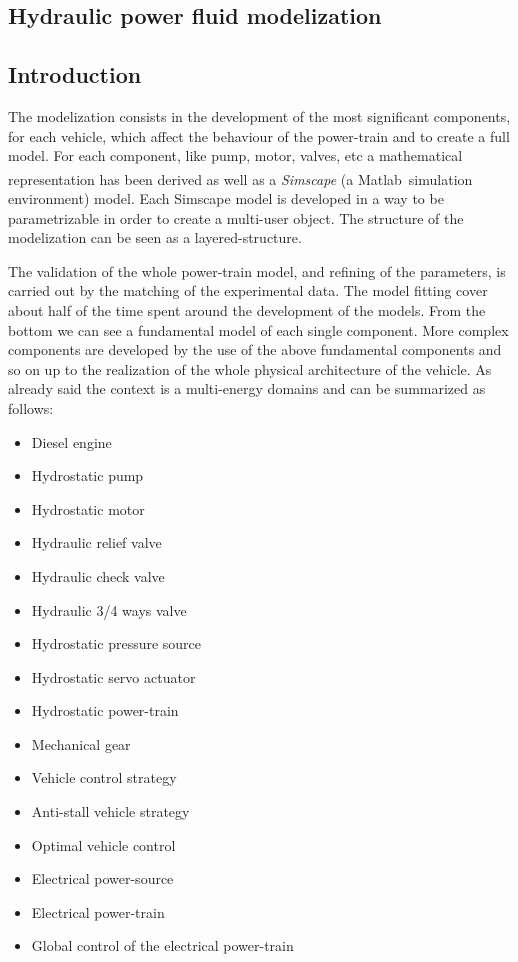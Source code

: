 \documentclass[12pt,a4paper,oneside]{book}
\begin{document}
\begin{onehalfspace}
	
\chapter{Hydraulic power fluid modelization}
\section{Introduction}
The modelization consists in the development of the most significant components, for each vehicle, which affect the behaviour of the power-train and to create a full model. For each component, like pump, motor, valves, etc a mathematical representation has been derived as well as a \textit{Simscape} (a Matlab\,\textsuperscript{\tiny\textregistered}  simulation environment) model. Each Simscape model is developed in a way to be parametrizable in order to create a multi-user object. The structure of the modelization can be seen as a layered-structure.

The validation of the whole power-train model, and refining of the parameters, is carried out by the matching of the experimental data. The model fitting cover about half of the time spent around the development of the models. From the bottom we can see a fundamental model of each single component. More complex components are developed by the use of the above fundamental components and so on up to the realization of the whole physical architecture of the vehicle. As already said the context is a multi-energy domains and can be summarized as follows:
\begin{itemize}
	\item Diesel engine
	\item Hydrostatic pump
	\item Hydrostatic motor
	\item Hydraulic relief valve
	\item Hydraulic check valve
	\item Hydraulic 3/4 ways valve
	\item Hydrostatic pressure source
	\item Hydrostatic servo actuator	
	\item Hydrostatic power-train
	\item Mechanical gear
	\item Vehicle control strategy
	\item Anti-stall vehicle strategy
	\item Optimal vehicle control
	\item Electrical power-source		
	\item Electrical power-train
	\item Global control of the electrical power-train
\end{itemize} 

\end{onehalfspace}
\end{document}
